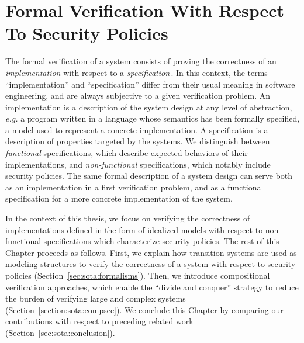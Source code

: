 \chapter{Formal Verification With Respect To Security Policies}
\label{chapter:relatedwork}



\vspace{1cm}\noindent
%
%
%
The formal verification of a system consists of proving the correctness of an
\emph{implementation} with respect to a
\emph{specification}\,\cite{gupta1992formal}.
%
In this context, the terms ``implementation'' and ``specification'' differ from
their usual meaning in software engineering, and are always subjective to a
given verification problem.
%
An implementation is a description of the system design at any level of
abstraction, \emph{e.g.} a program written in a language whose semantics has
been formally specified, a model used to represent a concrete implementation.
%
A specification is a description of properties targeted by the systems.
%
We distinguish between \emph{functional} specifications, which describe expected
behaviors of their implementations,
and \emph{non-functional} specifications, which notably include security
policies.
%
The same formal description of a system design can serve both as an
implementation in a first verification problem, and as a functional
specification for a more concrete implementation of the system.

In the context of this thesis, we focus on verifying the correctness of
implementations defined in the form of idealized models with respect to
non-functional specifications which characterize security policies.
%
%
The rest of this Chapter proceeds as follows.
%
First, we explain how transition systems are used as modeling structures to
verify the correctness of a system with respect to security policies
(Section~\ref{sec:sota:formalisms}).
%
Then, we introduce compositional verification approaches, which enable the
``divide and conquer'' strategy to reduce the burden of verifying large and
complex systems (Section~\ref{section:sota:compsec}).
%
We conclude this Chapter by comparing our contributions with respect to
preceding related work (Section~\ref{sec:sota:conclusion}).

